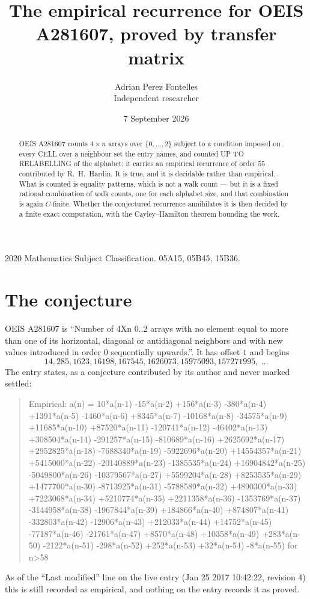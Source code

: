 \documentclass[11pt,a4paper]{article}
\title{The empirical recurrence for OEIS A281607, proved by transfer matrix}
\author{Adrian Perez Fontelles\\ \small Independent researcher}
\date{7 September 2026}
\theoremstyle{plain}
\theoremstyle{definition}
\begin{document}
\maketitle

\begin{abstract}
OEIS A281607 counts $4\times n$ arrays over $\{0,\dots,2\}$ subject to a condition imposed on
every CELL over a neighbour set the entry names, and counted UP TO RELABELLING of the
alphabet; it carries an empirical recurrence of order $55$ contributed by
R.~H.~Hardin. It is true, and it is decidable rather than empirical. What is counted is
equality patterns, which is not a walk count --- but it is a fixed rational combination of
walk counts, one for each alphabet size, and that combination is again $C$-finite. Whether the
conjectured recurrence annihilates it is then decided by a finite exact computation, with the
Cayley--Hamilton theorem bounding the work.
\end{abstract}

\noindent\small 2020 Mathematics Subject Classification. 05A15, 05B45, 15B36.\normalsize

\section{The conjecture}

OEIS A281607 is ``Number of 4Xn 0..2 arrays with no element equal to more than one of its horizontal, diagonal or antidiagonal neighbors and with new values introduced in order 0 sequentially upwards.''. It has offset $1$ and begins
\[
14, 285, 1623, 16198, 167545, 1626073, 15975093, 157271995,\ \dots
\]
The entry states, as a conjecture contributed by its author and never marked settled:
\begin{quote}
Empirical: a(n) = 10*a(n-1) -15*a(n-2) +156*a(n-3) -380*a(n-4) +1391*a(n-5) -1460*a(n-6) +8345*a(n-7) -10168*a(n-8) -34575*a(n-9) +11685*a(n-10) +87520*a(n-11) -120741*a(n-12) -46402*a(n-13) +308504*a(n-14) -291257*a(n-15) -810689*a(n-16) +2625692*a(n-17) +2952825*a(n-18) -7688340*a(n-19) -5922696*a(n-20) +14554357*a(n-21) +5415000*a(n-22) -20140889*a(n-23) -1385535*a(n-24) +16904842*a(n-25) -5049800*a(n-26) -10379567*a(n-27) +5599204*a(n-28) +8253535*a(n-29) +1477700*a(n-30) -8713925*a(n-31) -5788589*a(n-32) +4890300*a(n-33) +7223068*a(n-34) +5210774*a(n-35) +2211358*a(n-36) -1353769*a(n-37) -3144958*a(n-38) -1967844*a(n-39) +184866*a(n-40) +874807*a(n-41) -332803*a(n-42) -12906*a(n-43) +212033*a(n-44) +14752*a(n-45) -77187*a(n-46) -21761*a(n-47) +8570*a(n-48) +10358*a(n-49) +283*a(n-50) -2122*a(n-51) -298*a(n-52) +252*a(n-53) +32*a(n-54) -8*a(n-55) for n>58
\end{quote}
As of the ``Last modified'' line on the live entry (Jan 25 2017 10:42:22, revision 4) this is still
recorded as empirical, and nothing on the entry records it as proved.
\end{document}
